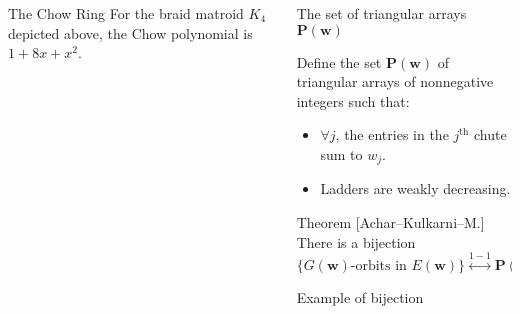 \documentclass[final]{beamer}
\newlength{\onecolwid}
\newlength{\twocolwid}
\newcommand{\Hora}{20}
\newcommand{\CC}{\mathbb{C}}
\newcommand{\bw}{\mathbf{w}}
\newcommand{\bP}{\mathbf{P}}
\begin{document}
\begin{frame}[t]
\begin{columns}[t]
\begin{column}{\onecolwid}
\begin{block}{The Chow Ring}
For the braid matroid $K_4$ depicted above, the Chow polynomial is $1+8x+x^2$.

\end{block}

\end{column} %

\begin{column}{\twocolwid} %

\begin{block}{The set of triangular arrays $\bP(\bw)$}


\kern0pt
\raggedright
\vspace{-.5cm}
Define the set $\bP(\bw)$ of triangular arrays of nonnegative integers such that:
\begin{itemize}
\item $\forall j$, the entries in the $j^{\mathrm{th}}$ chute sum to $w_j$.
\item Ladders are weakly decreasing.
\end{itemize}
\end{block}

\vspace{-6mm}
\begin{alertblock}{Theorem [Achar--Kulkarni--M.]}
There is a bijection
\[
\{G(\bw)\text{-orbits in } E(\bw)\} \stackrel{1-1}{\longleftrightarrow} \bP(\bw) = \{\text{certain tri. arrays}\}.
\]
\end{alertblock}


\vspace{-2mm}
\begin{block}{Example of bijection}
\begin{center}
\end{center}
\end{block}
\end{column}
\end{columns}
\end{frame}
\end{document}
